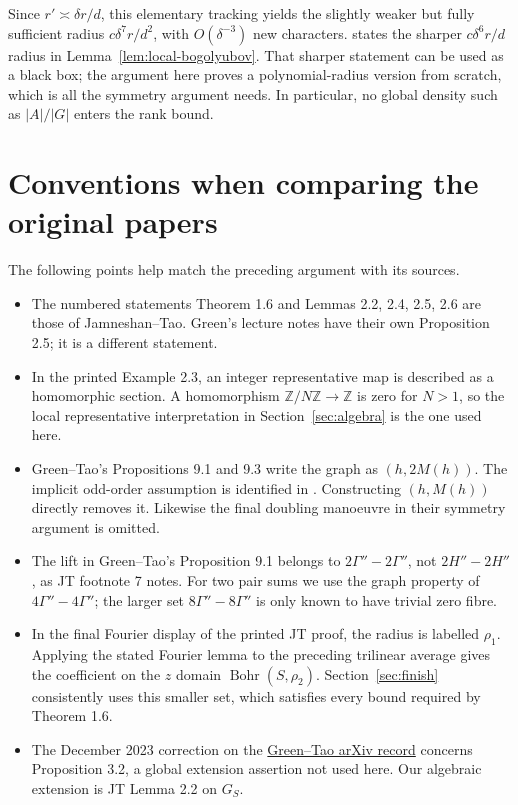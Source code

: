 \documentclass[11pt,a4paper]{article}
\newcommand{\Z}{\mathbb Z}
\newcommand{\Bohr}{\operatorname{Bohr}}
\newcommand{\JT}[1]{\cite[#1]{JT}}
\newcommand{\GT}[1]{\cite[#1]{GT}}
\theoremstyle{definition}
\numberwithin{equation}{section}
\begin{document}
Since $r'\asymp\delta r/d$, this elementary tracking yields the slightly
weaker but fully sufficient radius $c\delta^7r/d^2$, with
$O(\delta^{-3})$ new characters. \GT{Lemma 8.8} states the sharper
$c\delta^6r/d$ radius in Lemma~\ref{lem:local-bogolyubov}. That
sharper statement can be used as a black box; the argument here proves
a polynomial-radius version from scratch, which is all the symmetry
argument needs. In particular, no
global density such as $|A|/|G|$ enters the rank bound.

\section{Conventions when comparing the original papers}\label{app:conventions}
The following points help match the preceding argument with its sources.
\begin{itemize}
\item The numbered statements Theorem 1.6 and Lemmas 2.2, 2.4, 2.5,
2.6 are those of Jamneshan--Tao. Green's lecture notes have their own
Proposition 2.5; it is a different statement.
\item In the printed Example 2.3, an integer representative map is
described as a homomorphic section. A homomorphism $\Z/N\Z\to\Z$
is zero for $N>1$, so the local representative interpretation in
Section~\ref{sec:algebra} is the one used here.
\item Green--Tao's Propositions 9.1 and 9.3 write the graph as
$(h,2M(h))$. The implicit odd-order assumption is identified in
\JT{Lemma 2.5, footnote 6}. Constructing $(h,M(h))$ directly removes
it. Likewise the final doubling manoeuvre in their symmetry argument
is omitted.
\item The lift in Green--Tao's Proposition 9.1 belongs to
$2\Gamma''-2\Gamma''$, not $2H''-2H''$, as JT footnote 7 notes.
For two pair sums we use the graph property of $4\Gamma''-4\Gamma''$;
the larger set $8\Gamma''-8\Gamma''$ is only known to have trivial
zero fibre.
\item In the final Fourier display of the printed JT proof, the radius
is labelled $\rho_1$. Applying the stated Fourier lemma to the preceding
trilinear average gives the coefficient on the $z$ domain
$\Bohr(S,\rho_2)$. Section~\ref{sec:finish} consistently uses this
smaller set, which satisfies every bound required by Theorem 1.6.
\item The December 2023 correction on the
\href{https://arxiv.org/abs/math/0503014}{Green--Tao arXiv record}
concerns Proposition 3.2, a global extension assertion not used here.
Our algebraic extension is JT Lemma 2.2 on $G_S$.
\end{itemize}
\end{document}

